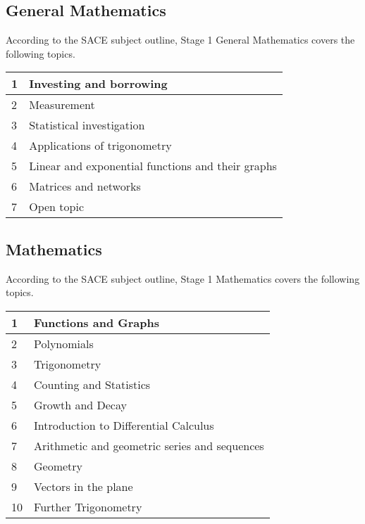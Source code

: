 \documentclass[11pt]{report}
\begin{document}
\subsection{General Mathematics}

    According to the SACE subject outline, Stage 1 General Mathematics covers the following topics.
    \begin{table}[H]
        \centering
        \begin{tabular}{|l|l|}
        \hline
            1 & Investing and borrowing \\ \hline
            2 & Measurement \\ \hline
            3 & Statistical investigation \\ \hline
            4 & Applications of trigonometry \\ \hline
            5 & Linear and exponential functions and their graphs \\ \hline
            6 & Matrices and networks \\ \hline
            7 & Open topic \\ \hline
        \end{tabular}
    \end{table}

\subsection{Mathematics}

    According to the SACE subject outline, Stage 1 Mathematics covers the following topics.
    \begin{table}[H]
        \centering
        \begin{tabular}{|l|l|}
        \hline
            1 & Functions and Graphs \\ \hline
            2 & Polynomials \\ \hline
            3 & Trigonometry \\ \hline
            4 & Counting and Statistics \\ \hline
            5 & Growth and Decay \\ \hline
            6 & Introduction to Differential Calculus \\ \hline
            7 & Arithmetic and geometric series and sequences \\ \hline
            8 & Geometry \\ \hline
            9 & Vectors in the plane \\ \hline
            10 & Further Trigonometry \\ \hline
        \end{tabular}
    \end{table}
\end{document}

